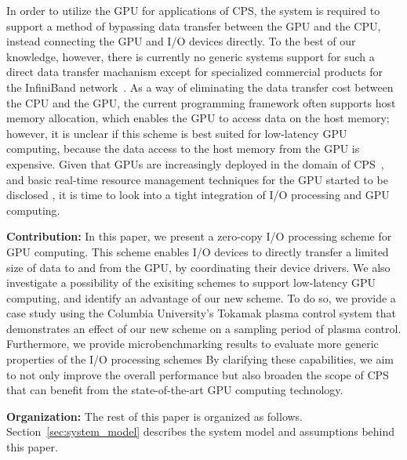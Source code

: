 In order to utilize the GPU for applications of CPS, the system is
required to support a method of bypassing data transfer between the GPU
and the CPU, instead connecting the GPU and I/O devices directly.
To the best of our knowledge, however, there is currently no generic
systems support for such a direct data transfer machanism except for
specialized commercial products for the InfiniBand
network~\cite{GPUDirect}.
As a way of eliminating the data transfer cost between the CPU and the
GPU, the current programming framework often supports host memory
allocation, which enables the GPU to access data on the host memory;
however, it is unclear if this scheme is best suited for low-latency GPU
computing, because the data access to the host memory from the GPU is
expensive.
Given that GPUs are increasingly deployed in the domain of
CPS~\cite{Hirabayashi_REACTION12, Mangharam11, McNaughton_ICRA11,
Michel_IROS07}, 
and basic real-time resource management techniques for the GPU started to be
disclosed \cite{Elliott_RTS12, Elliott_ECRTS12, Kato_RTAS11,
Kato_RTSS11, Kato_ATC11, Kato_ATC12, Liu_PACT12}, it is time to look
into a tight integration of I/O processing and GPU computing.

\textbf{Contribution:}
In this paper, we present a zero-copy I/O processing scheme for GPU
computing.
This scheme enables I/O devices to directly transfer a limited size of
data to and from the GPU, by coordinating their device drivers. 
We also investigate a possibility of the exisiting schemes to support
low-latency GPU computing, and identify an advantage of our new scheme.
To do so, we provide a case study using the Columbia University's
Tokamak plasma control system that demonstrates an effect of our
new scheme on a sampling period of plasma control.
Furthermore, we provide microbenchmarking results to evaluate more
generic properties of the I/O processing schemes
By clarifying these capabilities, we aim to not only improve the overall
performance but also broaden the scope of CPS that can benefit from the
state-of-the-art GPU computing technology.

\textbf{Organization:}
The rest of this paper is organized as follows.
Section~\ref{sec:system_model} describes the system model and
assumptions behind this paper.